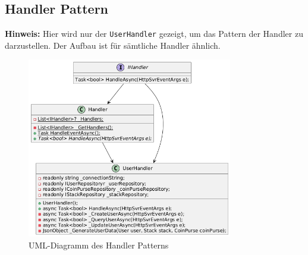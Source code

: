 \documentclass[a4paper, 12pt]{article}
\begin{document}
\subsection {Handler Pattern}
\noindent\textbf{Hinweis:} Hier wird nur der \texttt{UserHandler} gezeigt, um das Pattern der Handler zu darzustellen. Der Aufbau ist für sämtliche Handler ähnlich.
\begin{figure}[h!]
\centering
\includegraphics[width=0.8\textwidth]{Handler_UML_Example_User.png}
\caption{UML-Diagramm des Handler Patterns}
\label{fig:repository_pattern}
\end{figure}
\end{document}
